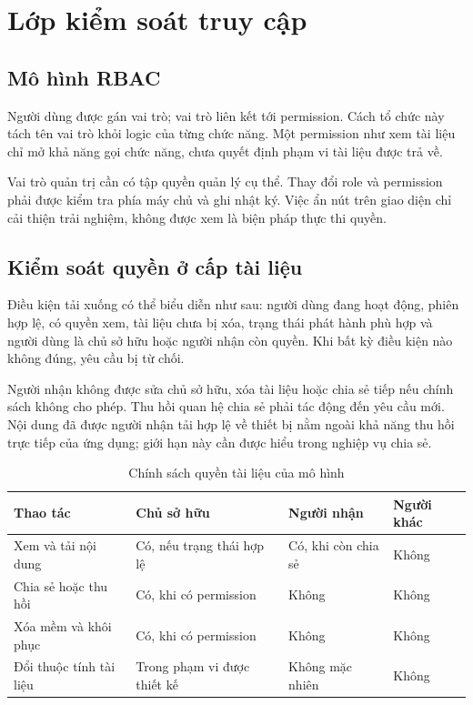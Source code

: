 \section{Lớp kiểm soát truy cập}
\subsection{Mô hình RBAC}
Người dùng được gán vai trò; vai trò liên kết tới permission. Cách tổ chức này tách tên vai trò khỏi logic của từng chức năng. Một permission như xem tài liệu chỉ mở khả năng gọi chức năng, chưa quyết định phạm vi tài liệu được trả về.

Vai trò quản trị cần có tập quyền quản lý cụ thể. Thay đổi role và permission phải được kiểm tra phía máy chủ và ghi nhật ký. Việc ẩn nút trên giao diện chỉ cải thiện trải nghiệm, không được xem là biện pháp thực thi quyền.
\subsection{Kiểm soát quyền ở cấp tài liệu}
Điều kiện tải xuống có thể biểu diễn như sau: người dùng đang hoạt động, phiên hợp lệ, có quyền xem, tài liệu chưa bị xóa, trạng thái phát hành phù hợp và người dùng là chủ sở hữu hoặc người nhận còn quyền. Khi bất kỳ điều kiện nào không đúng, yêu cầu bị từ chối.

Người nhận không được sửa chủ sở hữu, xóa tài liệu hoặc chia sẻ tiếp nếu chính sách không cho phép. Thu hồi quan hệ chia sẻ phải tác động đến yêu cầu mới. Nội dung đã được người nhận tải hợp lệ về thiết bị nằm ngoài khả năng thu hồi trực tiếp của ứng dụng; giới hạn này cần được hiểu trong nghiệp vụ chia sẻ.
\begin{table}[htbp]\centering\small
\caption{Chính sách quyền tài liệu của mô hình}
\begin{tabularx}{\textwidth}{P{3.3cm}XXX}\toprule
\textbf{Thao tác}&\textbf{Chủ sở hữu}&\textbf{Người nhận}&\textbf{Người khác}\\\midrule
Xem và tải nội dung & Có, nếu trạng thái hợp lệ & Có, khi còn chia sẻ & Không\\
Chia sẻ hoặc thu hồi & Có, khi có permission & Không & Không\\
Xóa mềm và khôi phục & Có, khi có permission & Không & Không\\
Đổi thuộc tính tài liệu & Trong phạm vi được thiết kế & Không mặc nhiên & Không\\\bottomrule
\end{tabularx}\end{table}
